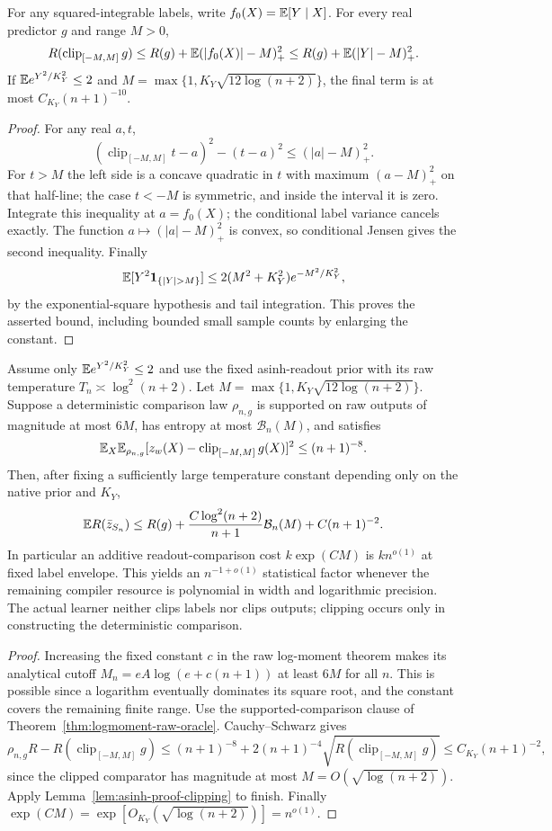 \begin{lemma}
\label{lem:asinh-proof-clipping}
For any squared-integrable labels, write $f_0(X)=\mathbb E[Y\mid X]$.
For every real predictor $g$ and range $M>0$,
\[
 R(\operatorname{clip}_{[-M,M]}g)
 \le R(g)+\mathbb E(|f_0(X)|-M)_+^2
 \le R(g)+\mathbb E(|Y|-M)_+^2.
\]
If $\mathbb E e^{Y^2/K_Y^2}\le2$ and
$M=\max\{1,K_Y\sqrt{12\log(n+2)}\}$, the final term is at most
$C_{K_Y}(n+1)^{-10}$.
\end{lemma}
\begin{proof}
For any real $a,t$,
\[
 (\operatorname{clip}_{[-M,M]}t-a)^2-(t-a)^2
       \le(|a|-M)_+^2.
\]
For $t>M$ the left side is a concave quadratic in $t$ with maximum
$(a-M)_+^2$ on that half-line; the case $t<-M$ is symmetric, and
inside the interval it is zero. Integrate this inequality at
$a=f_0(X)$; the conditional label variance cancels exactly.
The function $a\mapsto(|a|-M)_+^2$ is convex, so conditional Jensen
gives the second inequality. Finally
\[
 \E[Y^2\mathbf1_{\{|Y|>M\}}]
       \le2(M^2+K_Y^2)e^{-M^2/K_Y^2},
\]
by the exponential-square hypothesis and tail integration.
This proves the asserted bound, including bounded small sample counts
by enlarging the constant.
\end{proof}

\begin{corollary}
\label{cor:asinh-growing-compiler}
Assume only $\mathbb E e^{Y^2/K_Y^2}\le2$ and use the fixed asinh-readout
prior with its raw temperature $T_n\asymp\log^2(n+2)$.
Let $M=\max\{1,K_Y\sqrt{12\log(n+2)}\}$.
Suppose a deterministic comparison law $\rho_{n,g}$ is supported
on raw outputs of magnitude at most $6M$, has entropy at most
$\mathcal B_n(M)$, and satisfies
\[
 \mathbb E_X\mathbb E_{\rho_{n,g}}
   [z_w(X)-\operatorname{clip}_{[-M,M]}g(X)]^2
              \le(n+1)^{-8}.
\]
Then, after fixing a sufficiently large temperature constant depending
only on the native prior and $K_Y$,
\[
 \mathbb E R(\bar z_{S_n})\le R(g)
      +\frac{C\log^2(n+2)}{n+1}\mathcal B_n(M)
      +C(n+1)^{-2}.
\]
In particular an additive readout-comparison cost
$k\exp(CM)$ is $k n^{o(1)}$ at fixed label envelope. This yields an
$n^{-1+o(1)}$ statistical factor whenever the remaining compiler
resource is polynomial in width and logarithmic precision.
The actual learner neither clips labels nor clips outputs; clipping
occurs only in constructing the deterministic comparison.
\end{corollary}
\begin{proof}
Increasing the fixed constant $c$ in the raw log-moment theorem makes
its analytical cutoff $M_n=eA\log(e+c(n+1))$ at least $6M$ for
all $n$. This is possible since a logarithm eventually dominates its
square root, and the constant covers the remaining finite range.
Use the supported-comparison clause of
Theorem~\ref{thm:logmoment-raw-oracle}.
Cauchy--Schwarz gives
\[
 \rho_{n,g}R-R(\operatorname{clip}_{[-M,M]}g)
 \le(n+1)^{-8}
       +2(n+1)^{-4}\sqrt{R(\operatorname{clip}_{[-M,M]}g)}
 \le C_{K_Y}(n+1)^{-2},
\]
since the clipped comparator has magnitude at most $M=O(\sqrt{\log(n+2)})$.
Apply Lemma~\ref{lem:asinh-proof-clipping} to finish.
Finally $\exp(CM)=\exp[O_{K_Y}(\sqrt{\log(n+2)})]=n^{o(1)}$.
\end{proof}
